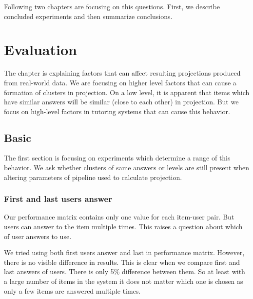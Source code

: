 \documentclass[
  printed, %
  table,   %
  nolof,     %
  nolot,     %
  color,
  final,
  nocover
]{fithesis3}
\begin{document}

Following two chapters are focusing on this questions. First, we describe concluded experiments and then summarize conclusions.


\chapter{Evaluation}\label{evaluation}

The chapter is explaining factors that can affect resulting projections produced from real-world data. We are focusing on higher level factors that can cause a formation of clusters in projection. On a low level, it is apparent that items which have similar answers will be similar (close to each other) in projection. But we focus on high-level factors in tutoring systems that can cause this behavior.


\section{Basic}\label{evaluation-basic}

The first section is focusing on experiments which determine a range of this behavior. We ask whether clusters of same answers or levels are still present when altering parameters of pipeline used to calculate projection.


\subsection{First and last users answer}\label{first-and-last-users-answer}


Our performance matrix contains only one value for each item-user pair. But users can answer to the item multiple times. This raises a question about which of user answers to use.


We tried using both first users answer and last in performance matrix. However, there is no visible difference in results. This is clear when we compare first and last answers of users. There is only 5\% difference between them. So at least with a large number of items in the system it does not matter which one is chosen as only a few items are answered multiple times.
\end{document}
